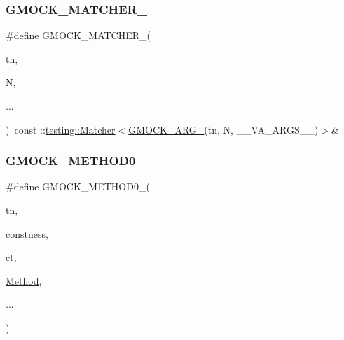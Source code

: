 \subsubsection{\texorpdfstring{G\+M\+O\+C\+K\+\_\+\+M\+A\+T\+C\+H\+E\+R\+\_\+}{GMOCK\_MATCHER\_}}
{\footnotesize\ttfamily \#define G\+M\+O\+C\+K\+\_\+\+M\+A\+T\+C\+H\+E\+R\+\_\+(\begin{DoxyParamCaption}\item[{}]{tn,  }\item[{}]{N,  }\item[{}]{... }\end{DoxyParamCaption})~const \+::\hyperlink{classtesting_1_1_matcher}{testing\+::\+Matcher}$<$\hyperlink{gmock-generated-function-mockers_8h_a887575cc1c31158fba808180a10c004f}{G\+M\+O\+C\+K\+\_\+\+A\+R\+G\+\_\+}(tn, N, \+\_\+\+\_\+\+V\+A\+\_\+\+A\+R\+G\+S\+\_\+\+\_\+)$>$\&}

\mbox{\label{gmock-generated-function-mockers_8h_ae0d290ffa58d7c624b2e3487ba1252f4}} 
\subsubsection{\texorpdfstring{G\+M\+O\+C\+K\+\_\+\+M\+E\+T\+H\+O\+D0\+\_\+}{GMOCK\_METHOD0\_}}
{\footnotesize\ttfamily \#define G\+M\+O\+C\+K\+\_\+\+M\+E\+T\+H\+O\+D0\+\_\+(\begin{DoxyParamCaption}\item[{}]{tn,  }\item[{}]{constness,  }\item[{}]{ct,  }\item[{}]{\hyperlink{gmock-spec-builders__test_8cc_a95606368148f3e5aab5db46c32466afd}{Method},  }\item[{}]{... }\end{DoxyParamCaption})}

